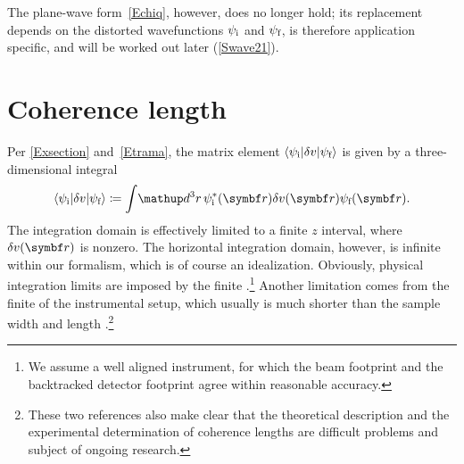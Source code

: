 The plane-wave form~\cref{Echiq}, however, does no longer hold;
its replacement depends on the distorted wavefunctions
$\psi_\si$ and $\psi_\sf$,
is therefore application specific,
and will be worked out later (\cref{Swave21}).

%


\section{Coherence length}\label{Scoherlen}

Per \cref{Exsection} and~\cref{Etrama},
%
the matrix element $\bra \psi_\ti|\delta v|\psi_\tf\ket$
is given by a three-dimensional integral
\begin{equation}\label{Etrama3}
  \bra \psi_\ti|\delta v|\psi_\tf\ket
  \coloneqq  \int\!\d^3r\, \psi^{*}_\ti(\r)\delta v(\r)\psi_\tf(\r).
\end{equation}
The integration domain is effectively limited to a finite $z$ interval,
where $\delta v(\r)$ is nonzero.
The horizontal integration domain, however, is infinite
within our formalism,
which is of course an idealization.
Obviously, physical integration limits are imposed by the finite
%
.\footnote
{We assume a well aligned instrument,
for which the beam footprint and the backtracked detector footprint
%
%
%
agree within reasonable accuracy.}
Another limitation comes from the finite 
of the instrumental setup,
which usually is much shorter than the sample width and length
\cite{HaPR10,MaMM14}.\footnote
{These two references also make clear that
  the theoretical description and the experimental determination of
  coherence lengths are difficult problems and subject of ongoing research.}

